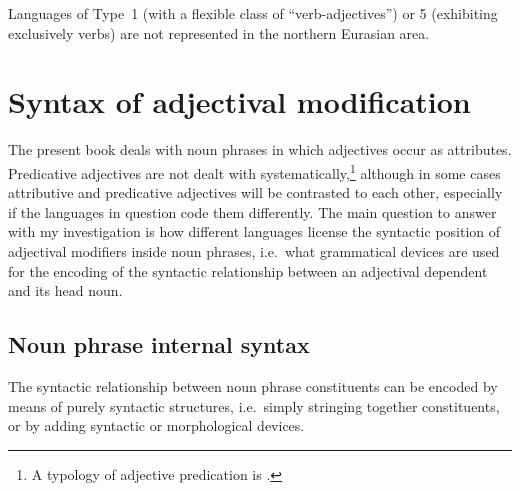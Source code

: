 Languages of Type~1 (with a flexible class of “verb-adjectives”) or 5 (exhibiting exclusively verbs) are not represented in the northern Eurasian area.

\section{Syntax of adjectival modification}
The present book deals with noun phrases in which adjectives occur as attributes. Predicative adjectives are not dealt with systematically,\footnote{A typology of adjective predication is \citet{wetzer1996}.} although in some cases attributive and predicative adjectives will be contrasted to each other, especially if the languages in question code them differently. The main question to answer with my investigation is how different languages license the syntactic position of adjectival modifiers inside noun phrases, i.e.~what grammatical devices are used for the encoding of the syntactic relationship between an adjectival dependent and its head noun. 

\subsection{Noun phrase internal syntax}
The syntactic relationship between noun phrase constituents can be encoded by means of purely syntactic structures, i.e.~simply stringing together constituents, or by adding syntactic or morphological devices. 

